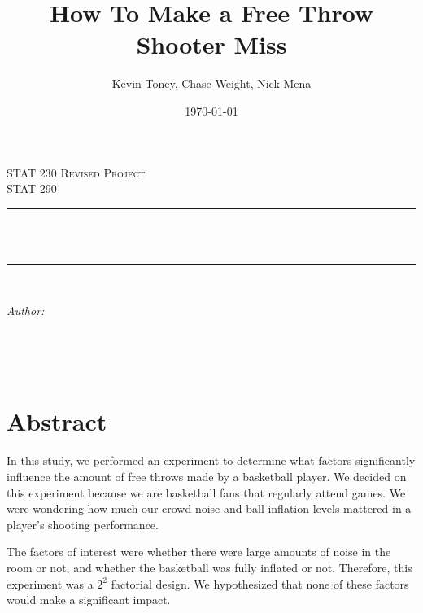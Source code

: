\documentclass[12pt]{article}\usepackage[]{graphicx}\usepackage[]{color}
\title{How To Make a Free Throw Shooter Miss}\par					%
\author{Kevin Toney, Chase Weight, Nick Mena}								%
\date{\today}											%
\makeatletter
\let\thetitle\@title
\let\theauthor\@author
\let\thedate\@date
\makeatother
\begin{document}

\begin{titlepage}
	\centering
    \vspace*{0.5 cm}
    \textsc{\LARGE STAT 230 Revised Project}\\[2.0 cm]	%
	\textsc{\Large STAT 290}\\[0.5 cm]				%
	\rule{\linewidth}{0.2 mm} \\[0.4 cm]
	{ \huge \bfseries \thetitle}\\
	\rule{\linewidth}{0.2 mm} \\[1.5 cm]
	
	\begin{minipage}{0.8\textwidth}
		\begin{flushleft} \large
			\emph{Author:}\\
			\theauthor
			\end{flushleft}
			\end{minipage}~
	
	{\large \thedate}\\[2 cm]
 
	\vfill
	
\end{titlepage}


\tableofcontents
\pagebreak



\section{Abstract}
\hspace{1cm}In this study, we performed an experiment to determine what factors significantly influence the amount of free throws made by a basketball player. We decided on this experiment because we are basketball fans that regularly attend games. We were wondering how much our crowd noise and ball inflation levels mattered in a player's shooting performance. 

\hspace{1cm}The factors of interest were whether there were large amounts of noise in the room or not, and whether the basketball was fully inflated or not. Therefore, this experiment was a $2^2$ factorial design. We hypothesized that none of these factors would make a significant impact.
\end{document}
